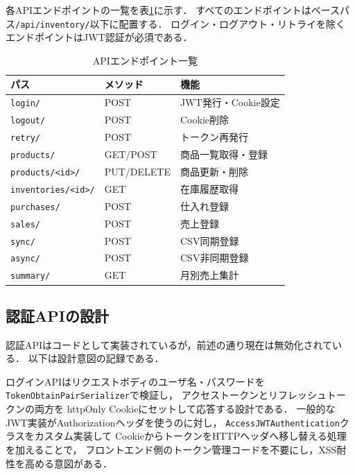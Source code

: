 \documentclass[submit,techrep]{ipsj}
\begin{document}
各APIエンドポイントの一覧を表\ref{tab:api}に示す．
すべてのエンドポイントはベースパス\texttt{/api/inventory/}以下に配置する．
ログイン・ログアウト・リトライを除くエンドポイントはJWT認証が必須である．

\begin{table}[H]
  \caption{APIエンドポイント一覧}
  \label{tab:api}
  \vspace{2mm}
  \centering
  \small
  \begin{tabular}{p{27mm}p{16mm}p{24mm}}
    \hline\hline
    \textbf{パス}          & \textbf{メソッド} & \textbf{機能} \\
    \hline
    \texttt{login/}            & POST       & JWT発行・Cookie設定 \\
    \texttt{logout/}           & POST       & Cookie削除 \\
    \texttt{retry/}            & POST       & トークン再発行 \\
    \texttt{products/}         & GET/POST   & 商品一覧取得・登録 \\
    \texttt{products/<id>/}    & PUT/DELETE & 商品更新・削除 \\
    \texttt{inventories/<id>/} & GET        & 在庫履歴取得 \\
    \texttt{purchases/}        & POST       & 仕入れ登録 \\
    \texttt{sales/}            & POST       & 売上登録 \\
    \texttt{sync/}             & POST       & CSV同期登録 \\
    \texttt{async/}            & POST       & CSV非同期登録 \\
    \texttt{summary/}          & GET        & 月別売上集計 \\
    \hline
  \end{tabular}
\end{table}

\subsection{認証APIの設計}

認証APIはコードとして実装されているが，前述の通り現在は無効化されている．
以下は設計意図の記録である．

ログインAPIはリクエストボディのユーザ名・パスワードを
\texttt{TokenObtainPairSerializer}で検証し，
アクセストークンとリフレッシュトークンの両方を
httpOnly Cookieにセットして応答する設計である\cite{simple-jwt}．
一般的なJWT実装がAuthorizationヘッダを使うのに対し，
\texttt{AccessJWTAuthentication}クラスをカスタム実装して
CookieからトークンをHTTPヘッダへ移し替える処理を加えることで，
フロントエンド側のトークン管理コードを不要にし，XSS耐性を高める意図がある\cite{owasp-session}．
\end{document}
